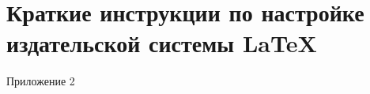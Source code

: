 \chapter{Краткие инструкции по настройке издательской системы \LaTeX}\label{appendix-MikTeX-TexStudio}						    %

Приложение 2

\NewPage %